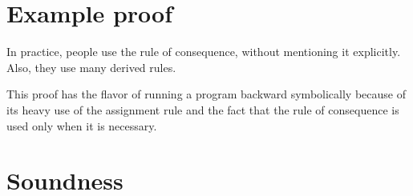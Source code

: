 \section{Example proof}

\todo

\begin{enumcirc}
	\item
	In practice, people use the rule of consequence, without mentioning it
	explicitly.
	Also, they use many derived rules.
	\item
	This proof has the flavor of running a program backward symbolically because of
	its heavy use of the assignment rule and the fact that the rule of consequence
	is used only when it is necessary.

	\begin{exercisetab}
		\todo
	\end{exercisetab}

	\begin{exercisetab}
		\todo
	\end{exercisetab}
\end{enumcirc}

\section{Soundness}

